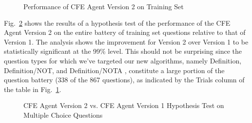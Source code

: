 \begin{figure}
\centering
\vspace{0.25in}
\caption{Performance of CFE Agent Version 2 on Training Set}
\label{fig:version_2_training_set_performance}
\end{figure}

Fig.~\ref{fig:version_2_multiple_choice_hypothesis_test} shows the results of a hypothesis test of the performance of the CFE Agent Version 2 on the entire battery of training set questions relative to that of Version 1.  The analysis shows the improvement for Version 2 over Version 1 to be statistically significant at the 99\% level.  This should not be surprising since the question types for which we've targeted our new algorithms, namely Definition, Definition/NOT, and Definition/NOTA , constitute a large portion of the question battery (338 of the 867 questions), as indicated by the Trials column of the table in Fig.~\ref{fig:version_2_training_set_performance}.

\begin{figure}
\centering
\vspace{0.75in}
\caption{CFE Agent Version 2 vs. CFE Agent Version 1 Hypothesis Test on Multiple Choice Questions}
\label{fig:version_2_multiple_choice_hypothesis_test}
\end{figure}

